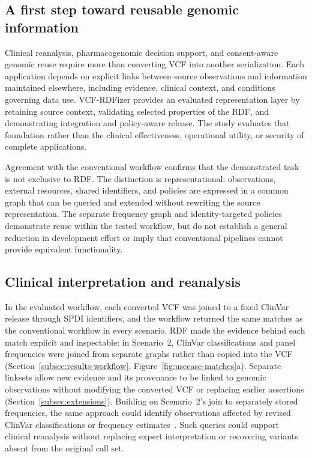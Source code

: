 \documentclass[pdflatex,sn-mathphys-num]{sn-jnl}
\begin{document}
\subsection{A first step toward reusable genomic information}\label{subsec:disc-first-step}
Clinical reanalysis, pharmacogenomic decision support, and consent-aware genomic reuse require more than converting VCF into another serialization.
Each application depends on explicit links between source observations and information maintained elsewhere, including evidence, clinical context, and conditions governing data use.
VCF-RDFizer provides an evaluated representation layer by retaining source context, validating selected properties of the RDF, and demonstrating integration and policy-aware release.
The study evaluates that foundation rather than the clinical effectiveness, operational utility, or security of complete applications.

Agreement with the conventional workflow confirms that the demonstrated task is not exclusive to RDF.
The distinction is representational: observations, external resources, shared identifiers, and policies are expressed in a common graph that can be queried and extended without rewriting the source representation.
The separate frequency graph and identity-targeted policies demonstrate reuse within the tested workflow, but do not establish a general reduction in development effort or imply that conventional pipelines cannot provide equivalent functionality.

\subsection{Clinical interpretation and reanalysis}\label{subsec:disc-reanalysis}
In the evaluated workflow, each converted VCF was joined to a fixed ClinVar release through SPDI identifiers, and the workflow returned the same matches as the conventional workflow in every scenario.
RDF made the evidence behind each match explicit and inspectable: in Scenario~2, ClinVar classifications and panel frequencies were joined from separate graphs rather than copied into the VCF (Section~\ref{subsec:results-workflow}, Figure~\ref{fig:usecase-matches}a).
Separate linksets allow new evidence and its provenance to be linked to genomic observations without modifying the converted VCF or replacing earlier assertions (Section~\ref{subsec:extensions}).
Building on Scenario~2's join to separately stored frequencies, the same approach could identify observations affected by revised ClinVar classifications or frequency estimates~\cite{richards2015standards,deignan2019reevaluation}.
Such queries could support clinical reanalysis without replacing expert interpretation or recovering variants absent from the original call set.
\end{document}
